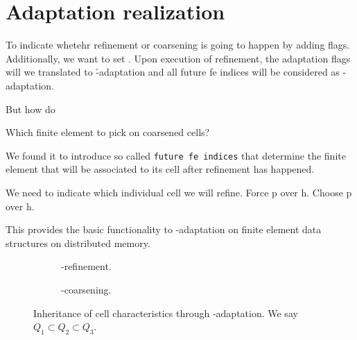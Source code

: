 \section{Adaptation realization}
\label{sec:adaptation}


To indicate whetehr refinement or coarsening is going to happen by adding flags. Additionally, we want to set . Upon execution of refinement, the adaptation flags will we translated to \h-adaptation and all future fe indices will be considered as \p-adaptation.

But how do

Which finite element to pick on coarsened cells?

We found it to introduce so called \texttt{future fe indices} that determine the finite element that will be associated to its cell after refinement has happened.

We need to indicate which individual cell we will refine. Force p over h. Choose p over h.

This provides the basic functionality to \hp-adaptation on finite element data structures on distributed memory.


\begin{figure}
\begin{subfigure}{.5\textwidth}
  \centering
  
  \caption{\hp-refinement.}
\end{subfigure}
\begin{subfigure}{.5\textwidth}
  \centering
  
  \caption{\hp-coarsening.}
\end{subfigure}
\caption{Inheritance of cell characteristics through \hp-adaptation. We say $Q_1 \subset Q_2 \subset Q_3$.}
\label{fig:adaptation.}
\end{figure}